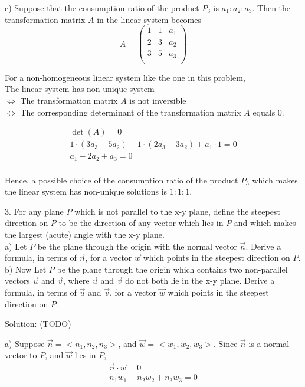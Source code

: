 \documentclass{article}
\begin{document}
c)
Suppose that the consumption ratio of the product $P_3$ is $a_1 : a_2 : a_3$. 
Then the transformation matrix $A$ in the linear system becomes
\begin{equation*}
  A = \begin{pmatrix}
        1 & 1 & a_1 \\
        2 & 3 & a_2 \\
        3 & 5 & a_3 \\ 
      \end{pmatrix}
\end{equation*}

For a non-homogeneous linear system like the one in this problem, \\
The linear system has non-unique system \\
$\iff$ The transformation matrix $A$ is not inversible \\
$\iff$ The corresponding determinant of the transformation matrix $A$ equals 0.

\begin{gather*}
  \det(A) = 0 \\
  1 \cdot (3a_3 - 5a_2) - 1 \cdot (2a_3 - 3a_2) + a_1 \cdot 1 = 0 \\
  a_1 - 2a_2 + a_3 = 0 \\
\end{gather*}

Hence, a possible choice of the consumption ratio of the product $P_3$ which 
makes the linear system has non-unique solutions is $1 : 1 : 1$.

\bigskip

3. For any plane $P$ which is not parallel to the x-y plane, define the steepest 
direction on $P$ to be the direction of any vector which lies in $P$ and which 
makes the largest (acute) angle with the x-y plane. \\
a) Let $P$ be the plane through the origin with the normal vector $\vec{n}$. 
Derive a formula, in terms of $\vec{n}$, for a vector $\vec{w}$ which points in 
the steepest direction on $P$. \\
b) Now Let $P$ be the plane through the origin which contains two non-parallel 
vectors $\vec{u}$ and $\vec{v}$, where $\vec{u}$ and $\vec{v}$ do not both lie 
in the x-y plane. Derive a formula, in terms of $\vec{u}$ and $\vec{v}$, for a 
vector $\vec{w}$ which points in the steepest direction on $P$.

Solution: (TODO)

a)
Suppose $\vec{n} = <n_1, n_2, n_3>$, and $\vec{w} = <w_1, w_2, w_3>$. Since 
$\vec{n}$ is a normal vector to $P$, and $\vec{w}$ lies in $P$,
\begin{gather*}
  \vec{n} \cdot \vec{w} = 0 \\
  n_1w_1 + n_2w_2 + n_3w_3 = 0 \\
\end{gather*}
\end{document}
